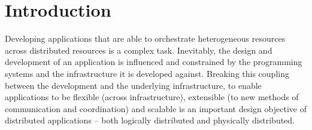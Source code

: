 \documentclass{rspublic}
\newcommand{\jhanote}[1]{ {\textcolor{red} { ***shantenu: #1 }}}
\newcommand{\jhanote}[1]{}
\begin{document}
\begin{abstract}{Replica-Exchange, SAGA, Large-Scale, Production}

\end{abstract}


\section{Introduction}
Developing applications that are able to orchestrate heterogeneous
resources across distributed resources is a complex task.  Inevitably,
the design and development of an application is influenced and
constrained by the programming systems and the infrastructure it is
developed against. Breaking this coupling between the development and
the underlying infrastructure, to enable applications to be flexible
(across infrastructure), extensible (to new methods of communication
and coordination) and scalable is an important design objective of
distributed applications -- both logically distributed and physically
distributed.
\end{document}
